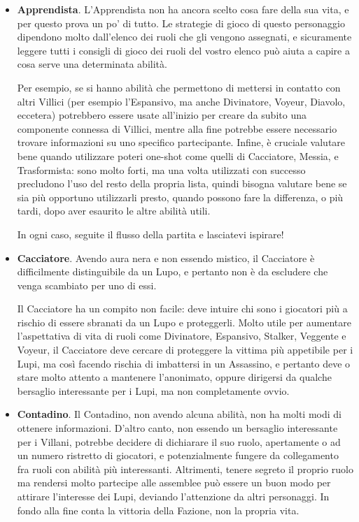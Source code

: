 \documentclass[a4paper,10pt]{article}
\begin{document}
\begin{itemize}
	
	\item {\bf Apprendista}. L'Apprendista non ha ancora scelto cosa fare della sua vita, e per questo prova un po' di tutto. Le strategie di gioco di questo personaggio dipendono molto dall'elenco dei ruoli che gli vengono assegnati, e sicuramente leggere tutti i consigli di gioco dei ruoli del vostro elenco può aiuta a capire a cosa serve una determinata abilità.
	
	Per esempio, se si hanno abilità che permettono di mettersi in contatto con altri Villici (per esempio l'Espansivo, ma anche Divinatore, Voyeur, Diavolo, eccetera) potrebbero essere usate all'inizio per creare da subito una componente connessa di Villici, mentre alla fine potrebbe essere necessario trovare informazioni su uno specifico partecipante. Infine, è cruciale valutare bene quando utilizzare poteri one-shot come quelli di Cacciatore, Messia, e Trasformista: sono molto forti, ma una volta utilizzati con successo precludono l'uso del resto della propria lista, quindi bisogna valutare bene se sia più opportuno utilizzarli presto, quando possono fare la differenza, o più tardi, dopo aver esaurito le altre abilità utili.
	
	In ogni caso, seguite il flusso della partita e lasciatevi ispirare! 

	\item {\bf Cacciatore}. Avendo aura nera e non essendo mistico, il Cacciatore è difficilmente distinguibile da un Lupo, e pertanto non è da escludere che venga scambiato per uno di essi. 
	
	Il Cacciatore ha un compito non facile: deve intuire chi sono i giocatori più a rischio di essere sbranati da un Lupo e proteggerli. Molto utile per aumentare l'aspettativa di vita di ruoli come Divinatore, Espansivo, Stalker, Veggente e Voyeur, il Cacciatore deve cercare di proteggere la vittima più appetibile per i Lupi, ma così facendo rischia di imbattersi in un Assassino, e pertanto deve o stare molto attento a mantenere l'anonimato, oppure dirigersi da qualche bersaglio interessante per i Lupi, ma non completamente ovvio.
	
	\item {\bf Contadino}. Il Contadino, non avendo alcuna abilità, non ha molti modi di ottenere informazioni. D'altro canto, non essendo un bersaglio interessante per i Villani, potrebbe decidere di dichiarare il suo ruolo, apertamente o ad un numero ristretto di giocatori, e potenzialmente fungere da collegamento fra ruoli con abilità più interessanti. Altrimenti, tenere segreto il proprio ruolo ma rendersi molto partecipe alle assemblee può essere un buon modo per attirare l'interesse dei Lupi, deviando l'attenzione da altri personaggi. In fondo alla fine conta la vittoria della Fazione, non la propria vita.
	

\end{itemize}
\end{document}
